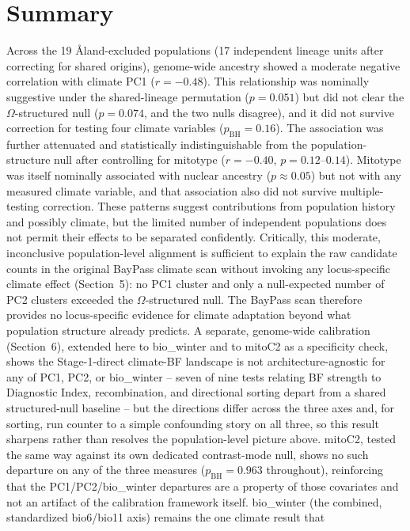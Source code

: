 \documentclass[11pt]{article}
\begin{document}
\section*{\color{Accent}Summary}
Across the 19 \AA land-excluded populations (17 independent lineage units after correcting
for shared origins), genome-wide ancestry showed a moderate negative correlation with
climate PC1 ($r=-0.48$). This relationship was nominally suggestive under the
shared-lineage permutation ($p=0.051$) but did not clear the $\Omega$-structured null
($p=0.074$, and the two nulls disagree), and it did not survive
correction for testing four climate variables ($p_{\mathrm{BH}}=0.16$). The association was
further attenuated and statistically indistinguishable from the population-structure null
after controlling for mitotype ($r=-0.40$, $p=0.12$--$0.14$). Mitotype was itself nominally
associated with nuclear ancestry ($p\approx0.05$) but not with any measured climate
variable, and that association also did not survive multiple-testing correction. These
patterns suggest contributions from population history and possibly climate, but the
limited number of independent populations does not permit their effects to be separated
confidently. Critically, this moderate, inconclusive population-level alignment is
sufficient to explain the raw candidate counts in the original BayPass climate scan without
invoking any locus-specific climate effect (Section~5): no PC1 cluster and only a
null-expected number of PC2 clusters exceeded the $\Omega$-structured null. The BayPass
scan therefore provides no locus-specific evidence for climate adaptation beyond what
population structure already predicts. A separate, genome-wide calibration (Section~6), extended here to bio\_winter and to mitoC2
as a specificity check, shows the Stage-1-direct climate-BF landscape is not
architecture-agnostic for any of PC1, PC2, or bio\_winter -- seven of nine tests relating BF
strength to Diagnostic Index, recombination, and directional sorting depart from a shared
structured-null baseline -- but the directions differ across the three axes and, for
sorting, run counter to a simple confounding story on all three, so this result sharpens
rather than resolves the population-level picture above. mitoC2, tested the same way against
its own dedicated contrast-mode null, shows no such departure on any of the three measures
($p_{\mathrm{BH}}=0.963$ throughout), reinforcing that the PC1/PC2/bio\_winter departures are
a property of those covariates and not an artifact of the calibration framework itself.
bio\_winter (the combined, standardized bio6/bio11 axis) remains the one climate result that
\end{document}
